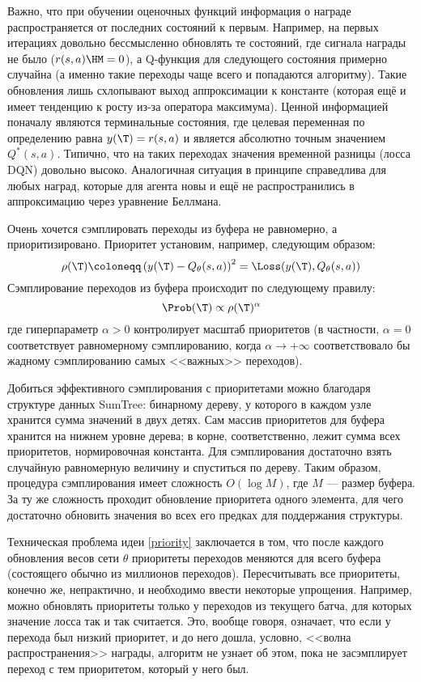 Важно, что при обучении оценочных функций информация о награде распространяется от последних состояний к первым. Например, на первых итерациях довольно бессмысленно обновлять те состояний, где сигнала награды не было ($r(s, a) \HM= 0$), а Q-функция для следующего состояния примерно случайна (а именно такие переходы чаще всего и попадаются алгоритму). Такие обновления лишь схлопывают выход аппроксимации к константе (которая ещё и имеет тенденцию к росту из-за оператора максимума). Ценной информацией поначалу являются терминальные состояния, где целевая переменная по определению равна $y(\T ) = r(s, a)$ и является абсолютно точным значением $Q^*(s, a)$. Типично, что на таких переходах значения временной разницы (лосса DQN) довольно высоко. Аналогичная ситуация в принципе справедлива для любых наград, которые для агента новы и ещё не распространились в аппроксимацию через уравнение Беллмана.

Очень хочется сэмплировать переходы из буфера не равномерно, а приоритизировано. Приоритет установим, например, следующим образом:
\begin{equation}\label{priority}
    \rho(\T ) \coloneqq \left( y(\T ) - Q_{\theta}(s, a) \right)^2 = \Loss(y(\T ), Q_{\theta}(s, a))
\end{equation}
Сэмплирование переходов из буфера происходит по следующему правилу:
$$\Prob ( \T ) \propto \rho( \T )^\alpha$$
где гиперпараметр $\alpha > 0$ контролирует масштаб приоритетов (в частности, $\alpha = 0$ соответствует равномерному сэмплированию, когда $\alpha \to +\infty$ соответствовало бы жадному сэмплированию самых <<важных>> переходов).

\begin{remark}
Добиться эффективного сэмплирования с приоритетами можно благодаря структуре данных SumTree: бинарному дереву, у которого в каждом узле хранится сумма значений в двух детях. Сам массив приоритетов для буфера хранится на нижнем уровне дерева; в корне, соответственно, лежит сумма всех приоритетов, нормировочная константа. Для сэмплирования достаточно взять случайную равномерную величину и спуститься по дереву. Таким образом, процедура сэмплирования имеет сложность $O(\log M)$, где $M$ --- размер буфера. За ту же сложность проходит обновление приоритета одного элемента, для чего достаточно обновить значения во всех его предках для поддержания структуры.
\end{remark}

Техническая проблема идеи \eqref{priority} заключается в том, что после каждого обновления весов сети $\theta$ приоритеты переходов меняются для всего буфера (состоящего обычно из миллионов переходов). Пересчитывать все приоритеты, конечно же, непрактично, и необходимо ввести некоторые упрощения. Например, можно обновлять приоритеты только у переходов из текущего батча, для которых значение лосса так и так считается. Это, вообще говоря, означает, что если у перехода был низкий приоритет, и до него дошла, условно, <<волна распространения>> награды, алгоритм не узнает об этом, пока не засэмплирует переход с тем приоритетом, который у него был.

